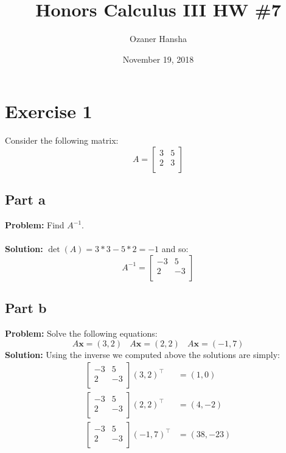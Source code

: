 \documentclass{article}
\begin{document}
\title{Honors Calculus III HW \#7}
\author{Ozaner Hansha}
\date{November 19, 2018}
\maketitle

\section*{Exercise 1}
Consider the following matrix:
$$A=\begin{bmatrix}
    3 & 5 \\
    2 & 3 \\
\end{bmatrix}$$
\subsection*{Part a}
\textbf{Problem:} Find $A^{-1}$.
\\\\
\textbf{Solution:} $\operatorname{det}(A)=3*3-5*2=-1$ and so:
$$A^{-1}=\begin{bmatrix}
    -3 & 5 \\
    2 & -3 \\
\end{bmatrix}$$

\subsection*{Part b}
\textbf{Problem:} Solve the following equations:
$$A\mathbf x=(3,2)\ \ \ \  A\mathbf x=(2,2)\ \ \ \  A\mathbf x=(-1,7)$$
\textbf{Solution:} Using the inverse we computed above the solutions are simply:
\begin{align*}
  \begin{bmatrix}
      -3 & 5 \\
      2 & -3 \\
  \end{bmatrix}(3,2)^\top&=(1,0)\\
  \begin{bmatrix}
      -3 & 5 \\
      2 & -3 \\
  \end{bmatrix}(2,2)^\top&=(4,-2)\\
  \begin{bmatrix}
      -3 & 5 \\
      2 & -3 \\
  \end{bmatrix}(-1,7)^\top&=(38,-23)\\
\end{align*}
\end{document}

